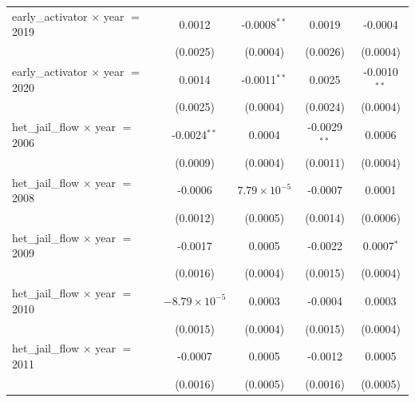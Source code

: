 \begin{tabular}{lcccc}
   early\_activator $\times$ year $=$ 2019               & 0.0012                 & -0.0008$^{**}$            & 0.0019                 & -0.0004\\   
                                                         & (0.0025)               & (0.0004)                  & (0.0026)               & (0.0004)\\   
   early\_activator $\times$ year $=$ 2020               & 0.0014                 & -0.0011$^{**}$            & 0.0025                 & -0.0010$^{**}$\\   
                                                         & (0.0025)               & (0.0004)                  & (0.0024)               & (0.0004)\\   
   het\_jail\_flow $\times$ year $=$ 2006                & -0.0024$^{**}$         & 0.0004                    & -0.0029$^{**}$         & 0.0006\\   
                                                         & (0.0009)               & (0.0004)                  & (0.0011)               & (0.0004)\\   
   het\_jail\_flow $\times$ year $=$ 2008                & -0.0006                & $7.79\times 10^{-5}$      & -0.0007                & 0.0001\\   
                                                         & (0.0012)               & (0.0005)                  & (0.0014)               & (0.0006)\\   
   het\_jail\_flow $\times$ year $=$ 2009                & -0.0017                & 0.0005                    & -0.0022                & 0.0007$^{*}$\\   
                                                         & (0.0016)               & (0.0004)                  & (0.0015)               & (0.0004)\\   
   het\_jail\_flow $\times$ year $=$ 2010                & $-8.79\times 10^{-5}$  & 0.0003                    & -0.0004                & 0.0003\\   
                                                         & (0.0015)               & (0.0004)                  & (0.0015)               & (0.0004)\\   
   het\_jail\_flow $\times$ year $=$ 2011                & -0.0007                & 0.0005                    & -0.0012                & 0.0005\\   
                                                         & (0.0016)               & (0.0005)                  & (0.0016)               & (0.0005)\\   

\end{tabular}
